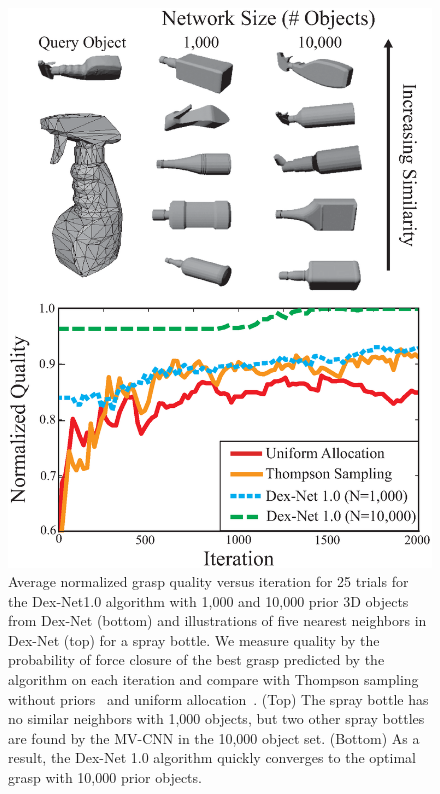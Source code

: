 \begin{figure}[t!]
\centering
\includegraphics[scale=0.45]{figures/illustrations/spray_bottle_avg_reward_w_neighbors.eps}
\caption{Average normalized grasp quality versus iteration for 25 trials for the Dex-Net1.0 algorithm with 1,000 and 10,000 prior 3D objects from Dex-Net (bottom) and illustrations of five nearest neighbors in Dex-Net (top) for a spray bottle. We measure quality by the probability of force closure of the best grasp predicted by the algorithm on each iteration and compare with Thompson sampling without priors~\cite{laskey2015bandits} and uniform allocation~\cite{kehoe2012toward, weisz2012pose}. (Top) The spray bottle has no similar neighbors with 1,000 objects, but two other spray bottles are found by the MV-CNN in the 10,000 object set. (Bottom) As a result, the Dex-Net 1.0 algorithm quickly converges to the optimal grasp with 10,000 prior objects.}
\vspace*{-20pt}
\end{figure}

